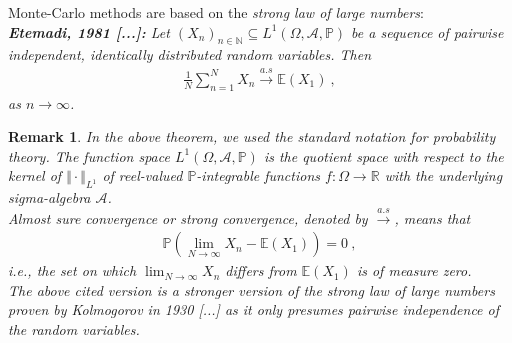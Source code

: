\documentclass[11pt,a4paper]{article}
\newtheorem{rmk}{Remark}%
\numberwithin{equation}{section}
\begin{document}
%
Monte-Carlo methods are based on the \textit{strong law of large numbers}:\\

\textit{
\textbf{Etemadi, 1981 [...]:} Let $(X_n)_{n\in\mathbb{N}}\subseteq L^1(\Omega, \mathcal{A}, \mathbb{P})$ be a sequence of pairwise independent, identically distributed random variables. Then
\begin{align*}
\frac{1}{N}\sum_{n=1}^NX_n\overset{a.s}{\longrightarrow}\mathbb{E}(X_1)~,
\end{align*}
as $n\to \infty$.
}

\begin{rmk}
In the above theorem, we used the standard notation for probability theory. The function space $L^1(\Omega, \mathcal{A}, \mathbb{P})$ is the quotient space with respect to the kernel of $\Vert\cdot\Vert_{L^1}$ of reel-valued $\mathbb{P}$-integrable functions $f:\Omega \to \mathbb{R}$ with the underlying sigma-algebra $\mathcal{A}$.\\
Almost sure convergence or strong convergence, denoted by $\overset{a.s}{\longrightarrow}$, means that
\begin{align*}
\mathbb{P}\left( \lim_{N\to \infty}X_n -  \mathbb{E}(X_1)\right)=0~,
\end{align*}
i.e., the set on which $\lim_{N\to \infty}X_n$ differs from $\mathbb{E}(X_1)$ is of measure zero.\\
The above cited version is a stronger version of the \textit{strong law of large numbers} proven by Kolmogorov in 1930 [...] as it only presumes pairwise independence of the random variables. 
\end{rmk}
\end{document}
